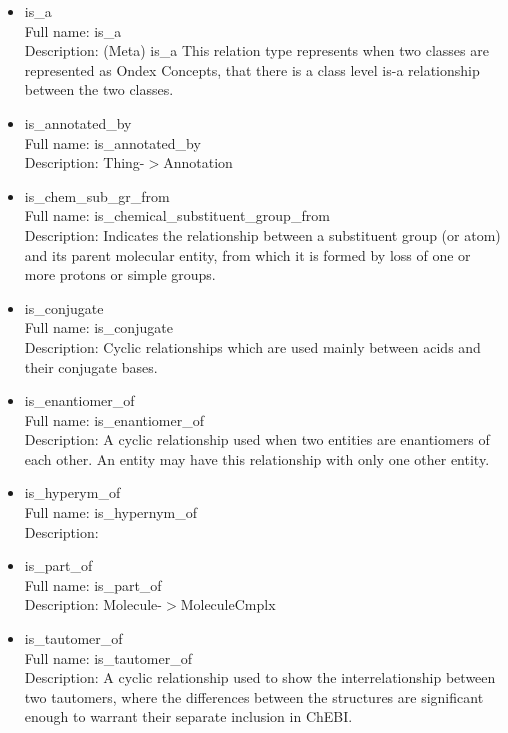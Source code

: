 \begin{itemize}
\item{is\_a}\\ Full name: is\_a\\ Description: (Meta) is\_a This relation type represents when two classes are represented as Ondex Concepts, that there is a class level is-a relationship between the two classes. 

\item{is\_annotated\_by}\\ Full name: is\_annotated\_by\\ Description: Thing-$>$Annotation 

\item{is\_chem\_sub\_gr\_from}\\ Full name: is\_chemical\_substituent\_group\_from\\ Description: Indicates the relationship between a substituent group (or atom) and its parent molecular entity, from which it is formed by loss of one or more protons or simple groups. 

\item{is\_conjugate}\\ Full name: is\_conjugate\\ Description: Cyclic relationships which are used mainly between acids and their conjugate bases. 

\item{is\_enantiomer\_of}\\ Full name: is\_enantiomer\_of\\ Description: A cyclic relationship used when two entities are enantiomers of each other. An entity may have this relationship with only one other entity. 

\item{is\_hyperym\_of}\\ Full name: is\_hypernym\_of\\ Description: 

\item{is\_part\_of}\\ Full name: is\_part\_of\\ Description: Molecule-$>$MoleculeCmplx 

\item{is\_tautomer\_of}\\ Full name: is\_tautomer\_of\\ Description: A cyclic relationship used to show the interrelationship between two tautomers, where the differences between the structures are significant enough to warrant their separate inclusion in ChEBI. 


\end{itemize}
